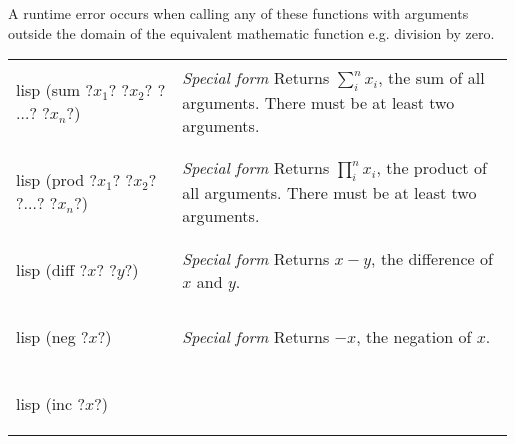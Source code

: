 \documentclass[a4paper, 12pt]{article}
\makeatletter
\newenvironment{funcdefs}
    {\begin{longtable}{@{} x{0.33\linewidth} @{} >{\raggedright\arraybackslash}p{0.66\linewidth} @{}}}
    {\end{longtable}}
\def\specialf/{\textit{Special form}\hspace{0.5em}}
\makeatother
\begin{document}
A runtime error occurs when calling any of these functions with arguments outside the domain of the equivalent mathematic function e.g. division by zero.

\begin{funcdefs}
    \begin{minipage}[t]{\linewidth}
        \centering
        \begin{cminted}[autogobble=true, escapeinside=??]{lisp}
            (sum ?$x_1$? ?$x_2$? ?$\ldots$? ?$x_n$?)
        \end{cminted}
    \end{minipage}
    & \specialf/ Returns $\sum_{i}^{n}{x_i}$, the sum of all arguments. There must be at least two arguments.
    \\ \\
    \begin{minipage}[t]{\linewidth}
        \centering
        \begin{cminted}[autogobble=true, escapeinside=??]{lisp}
            (prod ?$x_1$? ?$x_2$? ?$\ldots$? ?$x_n$?)
        \end{cminted}
    \end{minipage}
    & \specialf/ Returns $\prod_{i}^{n}{x_i}$, the product of all arguments. There must be at least two arguments.
    \\ \\
    \begin{minipage}[t]{\linewidth}
        \centering
        \begin{cminted}[autogobble=true, escapeinside=??]{lisp}
            (diff ?$x$? ?$y$?)
        \end{cminted}
    \end{minipage}
    & \specialf/ Returns $x - y$, the difference of $x$ and $y$.
    \\ \\
    \begin{minipage}[t]{\linewidth}
        \centering
        \begin{cminted}[autogobble=true, escapeinside=??]{lisp}
            (neg ?$x$?)
        \end{cminted}
    \end{minipage}
    & \specialf/ Returns $-x$, the negation of $x$.
    \\ \\
    \begin{minipage}[t]{\linewidth}
        \centering
        \begin{cminted}[autogobble=true, escapeinside=??]{lisp}
            (inc ?$x$?)

\end{cminted}
\end{minipage}
\end{funcdefs}
\end{document}
